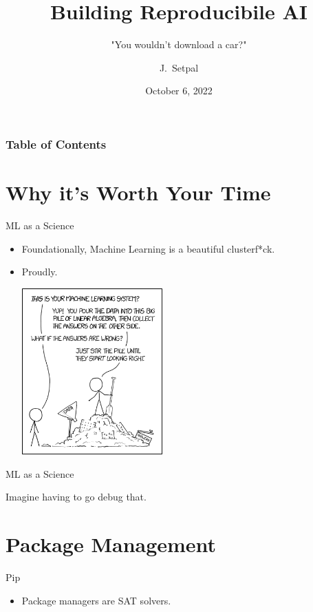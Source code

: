 \documentclass{beamer}
\title[Building Reproducible AI] %
{Building Reproducibile AI}
\subtitle{"You wouldn't download a car?"}
\author[SIGAI] %
{J.~Setpal}
\date{October 6, 2022}
\begin{document}
\frame{\titlepage}


\begin{frame}
\frametitle{Table of Contents}
\tableofcontents
\end{frame}


\section{Why it's Worth Your Time}

\begin{frame}{ML as a Science}
	\begin{itemize} 
		\item Foundationally, Machine Learning is a beautiful clusterf*ck. \pause
		\item Proudly. 
		\begin{center}
			\includegraphics[width=5.4cm]{images/1838}
		\end{center}
	\end{itemize}
\end{frame}

\begin{frame}{ML as a Science}
	\begin{center}
		Imagine having to go debug that.
	\end{center}
\end{frame}

\section{Package Management}

\begin{frame}{Pip}
	\begin{itemize}
		\item Package managers are SAT solvers. 
	\end{itemize}
\end{frame}
\end{document}

